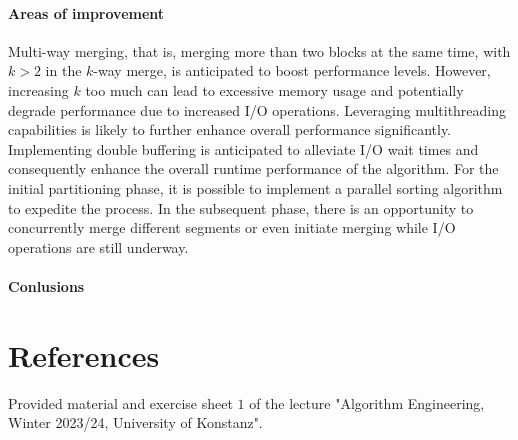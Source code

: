 \documentclass[twocolumn]{article}
\begin{document}
\paragraph{Areas of improvement}
Multi-way merging, that is, merging more than two blocks at the same time, with \( k > 2 \)  in the \( k \)-way merge, is anticipated to boost performance levels.
However, increasing \(k\) too much can lead to excessive memory usage and potentially degrade performance due to increased I/O operations.
Leveraging multithreading capabilities is likely to further enhance overall performance significantly.
Implementing double buffering is anticipated to alleviate I/O wait times and consequently enhance the overall runtime performance of the algorithm.
For the initial partitioning phase, it is possible to implement a parallel sorting algorithm to expedite the process.
In the subsequent phase, there is an opportunity to concurrently merge different segments or even initiate merging while I/O operations are still underway.

\paragraph{Conlusions}


\section{References}
Provided material and exercise sheet \( 1\) of the lecture "Algorithm Engineering, Winter 2023/24, University of Konstanz".
\end{document}

